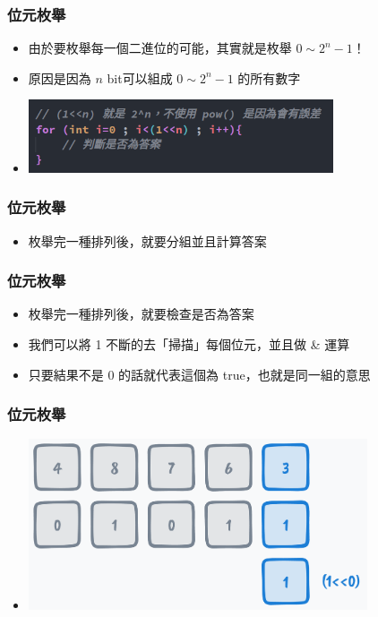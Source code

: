 \documentclass{beamer}
\begin{document}
\begin{frame}
    \frametitle{位元枚舉}
    \begin{itemize}
        \item 由於要枚舉每一個二進位的可能，其實就是枚舉 $0 \sim 2^n-1$！
        \item 原因是因為 $n$ bit可以組成 $0 \sim 2^n-1$ 的所有數字
        \vspace{0.5cm}
        \item \includegraphics[width=9.0cm]{img/img_4}
    \end{itemize}
\end{frame}

\begin{frame}
    \frametitle{位元枚舉}
    \begin{itemize}
        \item 枚舉完一種排列後，就要分組並且計算答案
    \end{itemize}
\end{frame}

\begin{frame}
    \frametitle{位元枚舉}
    \begin{itemize}
        \item 枚舉完一種排列後，就要檢查是否為答案
        \item 我們可以將 1 不斷的去「掃描」每個位元，並且做 \& 運算
        \item 只要結果不是 0 的話就代表這個為 true，也就是同一組的意思
    \end{itemize}
\end{frame}

\begin{frame}
    \frametitle{位元枚舉}
    \begin{itemize}
        \item \includegraphics[width=10.0cm]{img/img_5.png}
    \end{itemize}
\end{frame}
\end{document}
